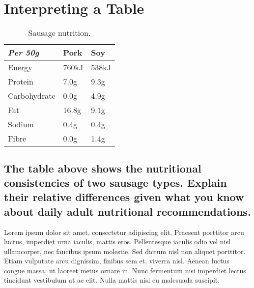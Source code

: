\documentclass[11pt]{scrartcl} %
\begin{document}

\section{Interpreting a Table}

\begin{table}[h] %
	\centering %
	\begin{tabular}{l l l}
		\toprule
		\textit{Per 50g} & \textbf{Pork} & \textbf{Soy} \\
		\midrule
		Energy & 760kJ & 538kJ\\
		Protein & 7.0g & 9.3g\\
		Carbohydrate & 0.0g & 4.9g\\
		Fat & 16.8g & 9.1g\\
		Sodium & 0.4g & 0.4g\\
		Fibre & 0.0g & 1.4g\\
		\bottomrule
	\end{tabular}
	\caption{Sausage nutrition.}
\end{table}


\subsection{The table above shows the nutritional consistencies of two sausage types. Explain their relative differences given what you know about daily adult nutritional recommendations.}

Lorem ipsum dolor sit amet, consectetur adipiscing elit. Praesent porttitor arcu luctus, imperdiet urna iaculis, mattis eros. Pellentesque iaculis odio vel nisl ullamcorper, nec faucibus ipsum molestie. Sed dictum nisl non aliquet porttitor. Etiam vulputate arcu dignissim, finibus sem et, viverra nisl. Aenean luctus congue massa, ut laoreet metus ornare in. Nunc fermentum nisi imperdiet lectus tincidunt vestibulum at ac elit. Nulla mattis nisl eu malesuada suscipit.

\end{document}

